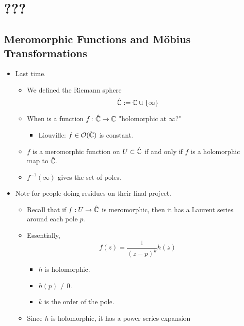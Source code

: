 \documentclass[../notes.tex]{subfiles}
\begin{document}
\chapter{???}
\section{Meromorphic Functions and M\"{o}bius Transformations}
\begin{itemize}
    \item {}Last time.
    \begin{itemize}
        \item We defined the Riemann sphere
        \begin{equation*}
            \hat{\mathbb{C}} := \mathbb{C}\cup\{\infty\}
        \end{equation*}
        \item When is a function $f:\hat{\mathbb{C}}\to\mathbb{C}$ "holomorphic at $\infty$?"
        \begin{itemize}
            \item Liouville: $f\in\mathcal{O}(\hat{\mathbb{C}})$ is constant.
        \end{itemize}
        \item $f$ is a meromorphic function on $U\subset\hat{\mathbb{C}}$ if and only if $f$ is a holomorphic map to $\hat{\mathbb{C}}$.
        \item $f^{-1}(\infty)$ gives the set of poles.
    \end{itemize}
    \item Note for people doing residues on their final project.
    \begin{itemize}
        \item Recall that if $f:U\to\hat{\mathbb{C}}$ is meromorphic, then it has a Laurent series around each pole $p$.
        \item Essentially,
        \begin{equation*}
            f(z) = \frac{1}{(z-p)^k}h(z)
        \end{equation*}
        \begin{itemize}
            \item $h$ is holomorphic.
            \item $h(p)\neq 0$.
            \item $k$ is the order of the pole.
        \end{itemize}
        \item Since $h$ is holomorphic, it has a power series expansion
        \begin{equation*}

\end{equation*}
\end{itemize}
\end{itemize}
\end{document}

